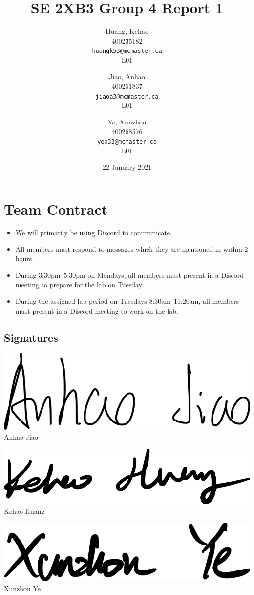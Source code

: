 \documentclass[titlepage, 12pt]{article}
\title{SE 2XB3 Group 4 Report 1}
\author{
  Huang, Kehao \\
  400235182 \\
  \texttt{huangk53@mcmaster.ca} \\
  L01
  \and
  Jiao, Anhao \\
  400251837 \\
  \texttt{jiaoa3@mcmaster.ca} \\
  L01
  \and
  Ye, Xunzhou \\
  400268576 \\
  \texttt{yex33@mcmaster.ca} \\
  L01
}
\date{22 January 2021}
\begin{document}
\maketitle{}

\section*{Team Contract}
\label{sec:contract}

\begin{itemize}
\item We will primarily be using Discord to communicate.
\item All members must respond to messages which they are mentioned in within 2
  hours.
\item During 3:30pm--5:30pm on Mondays, all members must present in a Discord
  meeting to prepare for the lab on Tuesday.
\item During the assigned lab period on Tuesdays 8:30am--11:20am, all members
  must present in a Discord meeting to work on the lab.
\end{itemize}

\subsection*{Signatures}

\bigskip{}

\begin{minipage}[t][4em][t]{0.33\linewidth}
  \includegraphics[width=0.8\linewidth]{anhao-signature}
  \centering
  Anhao Jiao
\end{minipage}
\begin{minipage}[t][4em][t]{0.33\linewidth}
  \includegraphics[width=0.8\linewidth]{kehao-signature}
  \centering
  Kehao Huang
\end{minipage}
\begin{minipage}[t][4em][t]{0.33\linewidth}
  \includegraphics[width=0.8\linewidth]{xunzhou-signature}
  \centering
  Xunzhou Ye
\end{minipage}
\end{document}

